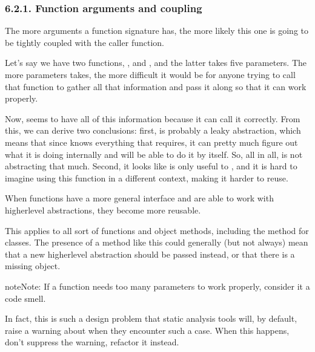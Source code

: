 \documentclass[a4paper,10pt,english]{sphinxmanual}
\begin{document}
\subsubsection{6.2.1. Function arguments and coupling}
\label{\detokenize{chapters/3_general_traits/index:function-arguments-and-coupling}}
The more arguments a function signature has, the more likely this one is going to be tightly coupled with the
caller function.

Let’s say we have two functions, , and , and the latter takes five parameters. The more parameters
 takes, the more difficult it would be for anyone trying to call that function to gather all that
information and pass it along so that it can work properly.

Now,  seems to have all of this information because it can call it correctly. From this, we can derive
two conclusions: first,  is probably a leaky abstraction, which means that since  knows everything
that  requires, it can pretty much figure out what it is doing internally and will be able to do it by
itself. So, all in all,  is not abstracting that much. Second, it looks like  is only useful to
, and it is hard to imagine using this function in a different context, making it harder to reuse.

When functions have a more general interface and are able to work with higher\sphinxhyphen{}level abstractions, they become
more reusable.

This applies to all sort of functions and object methods, including the  method for classes. The
presence of a method like this could generally (but not always) mean that a new higher\sphinxhyphen{}level abstraction
should be passed instead, or that there is a missing object.

\begin{sphinxadmonition}{note}{Note:}
If a function needs too many parameters to work properly, consider it a code smell.
\end{sphinxadmonition}

In fact, this is such a design problem that static analysis tools will, by default, raise a warning about
when they encounter such a case. When this happens, don’t suppress the warning, refactor it instead.
\end{document}
